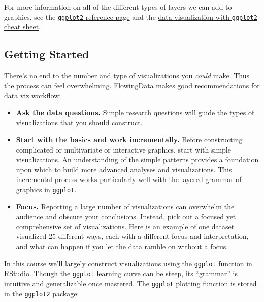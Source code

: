 \documentclass[
  letterpaper,
  DIV=11,
  numbers=noendperiod]{scrreprt}
\providecommand{\tightlist}{%
  \setlength{\itemsep}{0pt}\setlength{\parskip}{0pt}}\usepackage{longtable,booktabs,array}
\begin{document}
For more information on all of the different types of layers we can add
to graphics, see the
\href{https://ggplot2.tidyverse.org/reference/}{\texttt{ggplot2}
reference page} and the
\href{https://raw.githubusercontent.com/rstudio/cheatsheets/main/data-visualization.pdf}{data
visualization with \texttt{ggplot2} cheat sheet}.

\subsection*{Getting Started}\label{getting-started}

There's no end to the number and type of visualizations you \emph{could}
make. Thus the process can feel overwhelming.
\href{http://flowingdata.com/2017/01/24/one-dataset-visualized-25-ways/}{FlowingData}
makes good recommendations for data viz workflow:

\begin{itemize}
\tightlist
\item
  \textbf{Ask the data questions.} Simple research questions will guide
  the types of visualizations that you should construct.\\
\item
  \textbf{Start with the basics and work incrementally.} Before
  constructing complicated or multivariate or interactive graphics,
  start with simple visualizations. An understanding of the simple
  patterns provides a foundation upon which to build more advanced
  analyses and visualizations. This incremental process works
  particularly well with the layered grammar of graphics in
  \texttt{ggplot}.
\item
  \textbf{Focus.} Reporting a large number of visualizations can
  overwhelm the audience and obscure your conclusions. Instead, pick out
  a focused yet comprehensive set of visualizations.
  \href{http://flowingdata.com/2017/01/24/one-dataset-visualized-25-ways/}{Here}
  is an example of one dataset visualized 25 different ways, each with a
  different focus and interpretation, and what can happen if you let the
  data ramble on without a focus.
\end{itemize}

In this course we'll largely construct visualizations using the
\texttt{ggplot} function in RStudio. Though the \texttt{ggplot} learning
curve can be steep, its ``grammar'' is intuitive and generalizable once
mastered. The \texttt{ggplot} plotting function is stored in the
\texttt{ggplot2} package:
\end{document}
